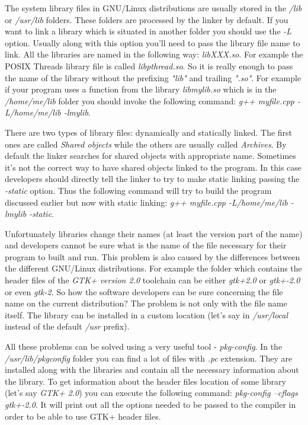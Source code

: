 The system library files in GNU/Linux distributions are usually stored in the \textit { /lib} or \textit { /usr/lib} folders. These folders are processed by the linker by default. If you want to link a library which is situated in another folder you should use the \textit { -L} option. Usually along with this option you'll need to pass the library file name to link. All the libraries are named in the following way: \textit { libXXX.so}. For example the POSIX Threads library file is called \textit { libpthread.so}. So it is really enough to pass the name of the library without the prefixing \textit { "lib"} and trailing \textit { ".so"}. For example if your program uses a function from the library \textit { libmylib.so} which is in the \textit { /home/me/lib} folder you should invoke the following command: \textit { g++ myfile.cpp -L/home/me/lib -lmylib}. 

There are two types of library files: dynamically and statically linked. The first ones are called \textit {Shared objects} while the others are usually called  \textit {Archives}. By default the linker searches for shared objects with appropriate name. Sometimes it's not the correct way to have shared objects linked to the program. In this case developers should directly tell the linker to try to make static linking passing the \textit { -static} option. Thus the following command will try to build the program discussed earlier but now with static linking: \textit { g++ myfile.cpp -L/home/me/lib -lmylib -static}. 

Unfortunately libraries change their names (at least the version part of the name) and developers cannot be sure what is the name of the file necessary for their program to built and run. This problem is also caused by the differences between the different GNU/Linux distributions. For example the folder which contains the header files of the \textit { GTK+ version 2.0} toolchain can be either \textit { gtk+2.0} or \textit { gtk+-2.0} or even \textit { gtk-2}. So how the software developers can be sure concerning the file name on the current distribution? The problem is not only with the file name itself. The library can be installed in a custom location (let's say in \textit { /usr/local} instead of the default \textit { /usr} prefix).

All these problems can be solved using a very useful tool - \textit { pkg-config}. In the \textit { /usr/lib/pkgconfig} folder you can find a lot of files with \textit { .pc} extension. They are installed along with the libraries and contain all the necessary information about the library. To get information about the header files location of some library (let's say \textit { GTK+ 2.0}) you can execute the following command: \textit { pkg-config --cflags gtk+-2.0}. It will print out all the options needed to be passed to the compiler in order to be able to use GTK+ header files.

